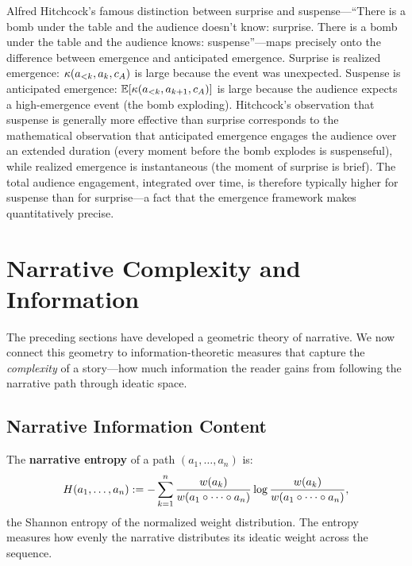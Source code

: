 \begin{remark}
\label{rem:hitchcock}
Alfred Hitchcock's famous distinction between surprise and suspense---``There is a bomb under the table and the audience doesn't know: surprise.  There is a bomb under the table and the audience knows: suspense''---maps precisely onto the difference between emergence and anticipated emergence.  Surprise is realized emergence: $\kappa(a_{<k}, a_k, c_A)$ is large because the event was unexpected.  Suspense is anticipated emergence: $\mathbb{E}[\kappa(a_{<k}, a_{k+1}, c_A)]$ is large because the audience expects a high-emergence event (the bomb exploding).  Hitchcock's observation that suspense is generally more effective than surprise corresponds to the mathematical observation that anticipated emergence engages the audience over an extended duration (every moment before the bomb explodes is suspenseful), while realized emergence is instantaneous (the moment of surprise is brief).  The total audience engagement, integrated over time, is therefore typically higher for suspense than for surprise---a fact that the emergence framework makes quantitatively precise.
\end{remark}


\section{Narrative Complexity and Information}

The preceding sections have developed a geometric theory of narrative.
We now connect this geometry to information-theoretic measures that capture
the \emph{complexity} of a story---how much information the reader gains
from following the narrative path through ideatic space.

\subsection{Narrative Information Content}

\begin{definition}
\label{def:narrative-entropy}
The \textbf{narrative entropy} of a path $(a_1, \ldots, a_n)$ is:
\[
  H(a_1, \ldots, a_n) := -\sum_{k=1}^{n}
  \frac{w(a_k)}{w(a_1 \circ \cdots \circ a_n)}
  \log \frac{w(a_k)}{w(a_1 \circ \cdots \circ a_n)},
\]
the Shannon entropy of the normalized weight distribution.  The entropy
measures how evenly the narrative distributes its ideatic weight across
the sequence.
\end{definition}


